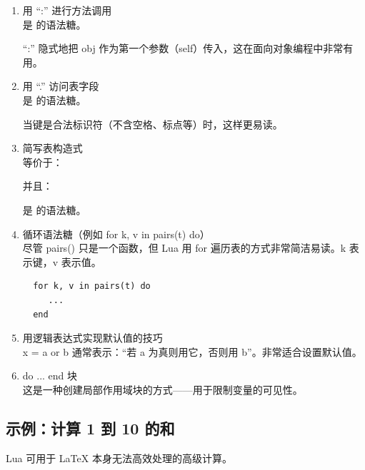    \begin{enumerate}
  \item  用 “:” 进行方法调用\\
  是  的语法糖。

 “:” 隐式地把 obj 作为第一个参数（self）传入，这在面向对象编程中非常有用。


  \item  用 “.” 访问表字段\\
   是  的语法糖。

  当键是合法标识符（不含空格、标点等）时，这样更易读。

  \item 简写表构造式\\
   等价于：

  并且：

   是  的语法糖。

  \item 循环语法糖（例如 for k, v in pairs(t) do）\\
  尽管 pairs() 只是一个函数，但 Lua 用 for 遍历表的方式非常简洁易读。k 表示键，v 表示值。

\begin{mybox}
\begin{verbatim}
  for k, v in pairs(t) do
     ...
  end
\end{verbatim}
\end{mybox}


 \item 用逻辑表达式实现默认值的技巧\\
 x = a or b
 通常表示：“若 a 为真则用它，否则用 b”。非常适合设置默认值。

 \item do ... end 块\\
 这是一种创建局部作用域块的方式——用于限制变量的可见性。
\end{enumerate}

\subsection{示例：计算 1 到 10 的和}
\label{sub:calculating_the_sum}

Lua 可用于 LaTeX 本身无法高效处理的高级计算。

\vspace{1em}
\begin{tkzexample}[latex=.5\textwidth]
\end{tkzexample}
%

